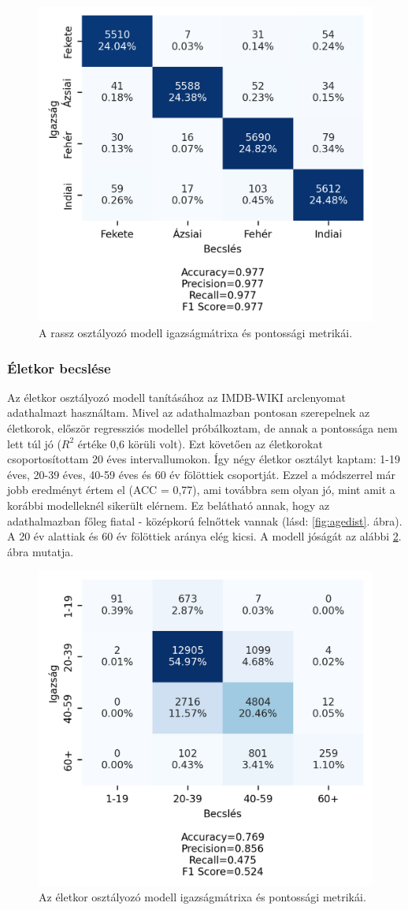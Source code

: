 \begin{figure}[ht]
	\centering
	\includegraphics[width=0.7\columnwidth]{figures/conf_race.png}
	\caption{A rassz osztályozó modell igazságmátrixa és pontossági metrikái.}
	\label{fig:conf_race}
\end{figure}

\subsubsection*{Életkor becslése}
Az életkor osztályozó modell tanításához az IMDB-WIKI arclenyomat adathalmazt használtam. Mivel az adathalmazban pontosan szerepelnek az életkorok, először regressziós modellel próbálkoztam, de annak a pontossága nem lett túl jó ($R^2$ értéke 0,6 körüli volt). Ezt követően az életkorokat csoportosítottam 20 éves intervallumokon. Így négy életkor osztályt kaptam: 1-19 éves, 20-39 éves, 40-59 éves és 60 év fölöttiek csoportját. Ezzel a módszerrel már jobb eredményt értem el (ACC = 0,77), ami továbbra sem olyan jó, mint amit a korábbi modelleknél sikerült elérnem. Ez belátható annak, hogy az adathalmazban főleg fiatal - középkorú felnőttek vannak (lásd: \ref{fig:agedist}. ábra). A 20 év alattiak és 60 év fölöttiek aránya elég kicsi. A modell jóságát az alábbi \ref{fig:conf_age}. ábra mutatja.

\begin{figure}[ht]
	\centering
	\includegraphics[width=0.7\columnwidth]{figures/conf_age.png}
	\caption{Az életkor osztályozó modell igazságmátrixa és pontossági metrikái.}
	\label{fig:conf_age}
\end{figure}

